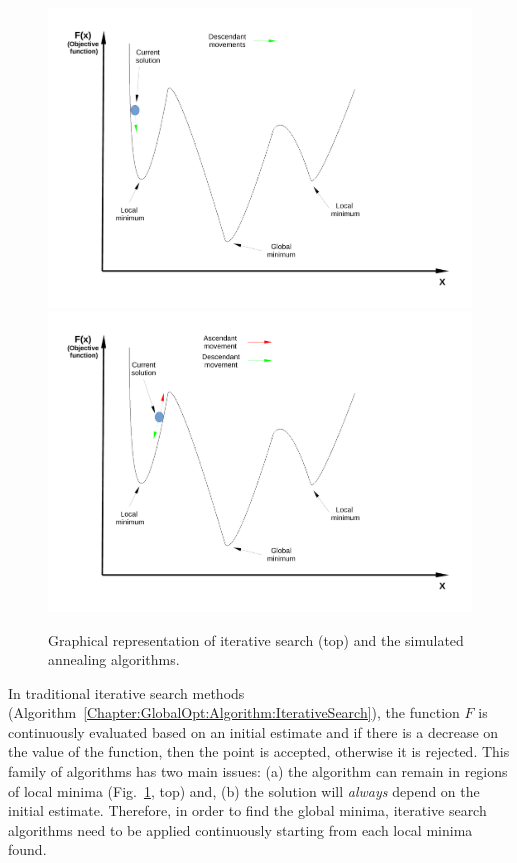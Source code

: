 \begin{figure}[h]
          \includegraphics[width=\columnwidth,clip]{./Figs/IterativeSearchAlgorithm}\vspace{-0.5cm}
          \includegraphics[width=\columnwidth,clip]{./Figs/SimulatedAnnealingAlgorithm}\vspace{-0.5cm}
           \caption{Graphical representation of iterative search (top) and the simulated annealing algorithms.} 
\label{Chapter:GlobalOpt:Fig:IterativeSearch_SA_Algorithms}
\end{figure}
In traditional iterative search methods (Algorithm~\ref{Chapter:GlobalOpt:Algorithm:IterativeSearch}), the function $F$ is continuously evaluated based on an initial estimate and if there is a decrease on the value of the function, then the point is accepted, otherwise it is rejected. This family of algorithms has two main issues: (a) the algorithm can remain in regions of local minima (Fig.~\ref{Chapter:GlobalOpt:Fig:IterativeSearch_SA_Algorithms}, top) and, (b) the solution will {\it always} depend on the initial estimate. Therefore, in order to find the global minima, iterative search algorithms need to be applied continuously starting from each local minima found.
\medskip

